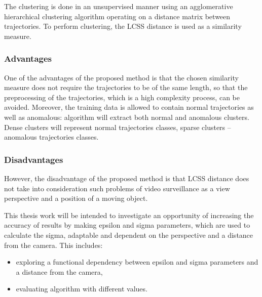 The clustering is done in an unsupervised manner using an agglomerative hierarchical clustering algorithm operating on a distance matrix between trajectories. To perform clustering, the LCSS distance is used as a similarity measure. 

\subsubsection{Advantages}
One of the advantages of the proposed method is that the chosen similarity measure does not require the trajectories to be of the same length, so that the preprocessing of the trajectories, which is a high complexity process, can be avoided. Moreover, the training data is allowed to contain normal trajectories as well as anomalous: algorithm will extract both normal and anomalous clusters. Dense clusters will represent normal trajectories classes, sparse clusters – anomalous trajectories classes.


\subsubsection{Disadvantages}
However, the disadvantage of the proposed method is that LCSS distance does not take into consideration such problems of video surveillance as a view perspective and a position of a moving object. 

This thesis work will be intended to investigate an opportunity of increasing the accuracy of results by making epsilon and sigma parameters, which are used to calculate the sigma, adaptable and dependent on the perspective and a distance from the camera. This includes:
\begin{itemize}
	\item exploring a functional dependency between epsilon and sigma parameters and a distance from the camera,
	\item evaluating algorithm with different values.
\end{itemize}